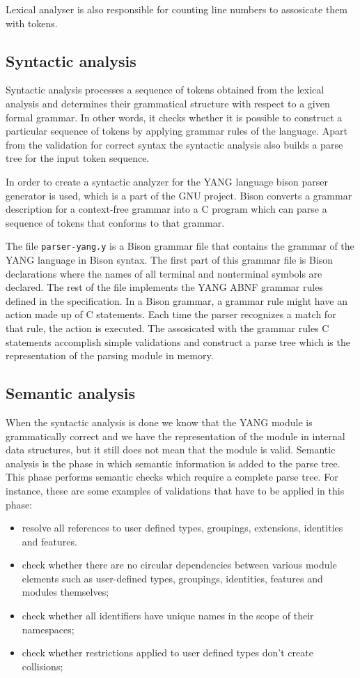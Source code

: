 \documentclass[conference]{IEEEtran}
\begin{document}
Lexical analyser is also responsible for counting line numbers to assosicate them with tokens.

\subsection{Syntactic analysis}
Syntactic analysis processes a sequence of tokens obtained from the lexical analysis and determines their grammatical structure with respect to a given formal grammar. In other words, it checks whether it is possible to construct a particular sequence of tokens by applying grammar rules of the language. Apart from the validation for correct syntax the syntactic analysis also builds a parse tree for the input token sequence. 

In order to create a syntactic analyzer for the YANG language bison parser generator \cite{bib6} is used, which is a part of the GNU project. Bison converts a grammar description for a context-free grammar into a C program which can parse a sequence of tokens that conforms to that grammar. 

The file \texttt{parser-yang.y} is a Bison grammar file that contains the grammar of the YANG language in Bison syntax. The first part of this grammar file is Bison declarations where the names of all terminal and nonterminal symbols are declared. The rest of the file implements the YANG ABNF grammar rules defined in the specification. In a Bison grammar, a grammar rule might have an action made up of C statements. Each time the parser recognizes a match for that rule, the action is executed. The assosicated with the grammar rules C statements accomplish simple validations and construct a parse tree which is the representation of the parsing module in memory.

\subsection{Semantic analysis}
When the syntactic analysis is done we know that the YANG module is grammatically correct and we have the representation of the module in internal data structures, but it still does not mean that the  module is valid. Semantic analysis is the phase in which semantic information is added to the parse tree. This phase performs semantic checks which require a complete parse tree. For instance, these are some examples of validations that have to be applied in this phase:
\begin{itemize}
\item resolve all references to user defined types, groupings, extensions, identities and features.
\item check whether there are no
  circular dependencies between various module elements such as user-defined types, groupings, identities, features and modules themselves;
\item check whether all identifiers have unique names in the scope of their namespaces;
\item check whether restrictions applied to user defined types don't create collisions;
\end{itemize}
\end{document}
